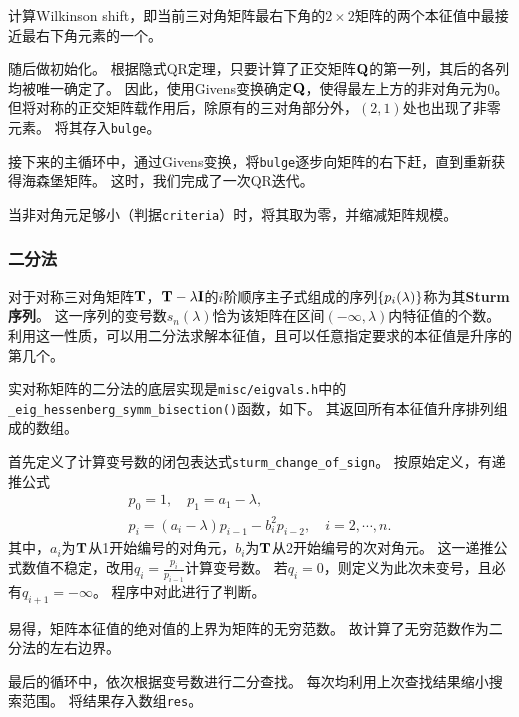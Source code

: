 \documentclass[a4paper,unicode]{report}
\begin{document}
计算Wilkinson shift，即当前三对角矩阵最右下角的$2\times 2$矩阵的两个本征值中最接近最右下角元素的一个。

随后做初始化。
根据隐式QR定理，只要计算了正交矩阵$\vb{Q}$的第一列，其后的各列均被唯一确定了。
因此，使用Givens变换确定$\vb{Q}$，使得最左上方的非对角元为0。
但将对称的正交矩阵载作用后，除原有的三对角部分外，$(2,1)$处也出现了非零元素。
将其存入\texttt{bulge}。

接下来的主循环中，通过Givens变换，将\texttt{bulge}逐步向矩阵的右下赶，直到重新获得海森堡矩阵。
这时，我们完成了一次QR迭代。

当非对角元足够小（判据\texttt{criteria}）时，将其取为零，并缩减矩阵规模。

\subsubsection{二分法}
对于对称三对角矩阵$\vb{T}$，$\vb{T}-\lambda\vb{I}$的$i$阶顺序主子式组成的序列$\qty{p_i(\lambda)}$称为其\textbf{Sturm序列}。
这一序列的变号数$s_n(\lambda)$恰为该矩阵在区间$(-\infty, \lambda)$内特征值的个数。
利用这一性质，可以用二分法求解本征值，且可以任意指定要求的本征值是升序的第几个。

实对称矩阵的二分法的底层实现是\texttt{misc/eigvals.h}中的\texttt{\_eig\_hessenberg\_symm\_bisection()}函数，如下。
其返回所有本征值升序排列组成的数组。
{
    \linespread{1.0}
    
}

首先定义了计算变号数的闭包表达式\texttt{sturm\_change\_of\_sign}。
按原始定义，有递推公式
\begin{gather}
    p_0 = 1,\quad p_1 = a_1 - \lambda,\\
    p_i = (a_i - \lambda)p_{i-1} - b_i^2p_{i-2},\quad i=2,\cdots,n.
\end{gather}
其中，$a_i$为$\vb{T}$从1开始编号的对角元，$b_i$为$\vb{T}$从2开始编号的次对角元。
这一递推公式数值不稳定，改用$q_i = \frac{p_i}{p_{i-1}}$计算变号数。
若$q_i=0$，则定义为此次未变号，且必有$q_{i+1} = -\infty$。
程序中对此进行了判断。

易得，矩阵本征值的绝对值的上界为矩阵的无穷范数。
故计算了无穷范数作为二分法的左右边界。

最后的循环中，依次根据变号数进行二分查找。
每次均利用上次查找结果缩小搜索范围。
将结果存入数组\texttt{res}。
\end{document}
